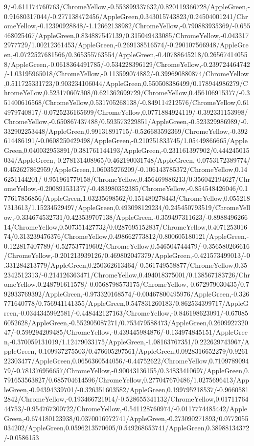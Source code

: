 {\begin{tikzternal}
9/-0.611174760763/ChromeYellow,-0.553899337632/0.820119366728/AppleGreen,-0.91680317044/-0.277138472456/AppleGreen,0.343015743823/0.24504001241/ChromeYellow,-0.12390928848/-1.12662138982/ChromeYellow,-0.790883935369/-0.655468025467/AppleGreen,0.834887547139/0.315049433085/ChromeYellow,-0.0433172977729/1.00212361453/AppleGreen,-0.269138516574/-0.290107566948/AppleGreen,-0.0722527681566/0.365355763554/AppleGreen,-0.40788645218/0.265674140558/AppleGreen,-0.0618364491785/-0.534228396129/ChromeYellow,-0.239724464742/-1.03195965018/ChromeYellow,-0.113599074882/-0.399690880874/ChromeYellow,0.511725331723/0.903234106044/AppleGreen,0.550508386499/0.178944986279/ChromeYellow,0.523170607308/0.621362699729/ChromeYellow,0.456106915377/-0.351400616568/ChromeYellow,0.531705268138/-0.849114212576/ChromeYellow,0.614979740817/-0.0725236165699/ChromeYellow,0.0771884924119/-0.392331153998/ChromeYellow,-0.650867437488/0.593573229851/AppleGreen,-0.523329986989/-0.332902253448/AppleGreen,0.99131891715/-0.526683592369/ChromeYellow,-0.392614486191/-0.0608250429498/AppleGreen,-0.210251833745/1.05449866665/AppleGreen,0.040032953891/0.381761144193/AppleGreen,-0.231161397902/0.444245015034/AppleGreen,-0.278131408965/0.462190031748/AppleGreen,-0.0753172389774/0.452627862959/AppleGreen,1.06035276209/-0.106143785372/ChromeYellow,0.146251144201/-0.951961779158/ChromeYellow,0.456469886213/0.356042194627/ChromeYellow,-0.200891531377/-0.483980352385/ChromeYellow,-0.854548426046/0.177617856856/AppleGreen,1.03235698562/0.151480278443/ChromeYellow,0.0552187313613/1.15234529497/AppleGreen,0.493098129234/0.245450793519/ChromeYellow,-0.334674532731/0.423539707138/AppleGreen,-0.359497311623/-0.898849626614/ChromeYellow,0.507351427732/0.0287695152837/ChromeYellow,0.407125301674/0.313239476376/ChromeYellow,0.498662773812/0.800605180121/AppleGreen,-0.122817407789/-0.527537719602/ChromeYellow,0.546504744479/-0.356580266616/ChromeYellow,-0.201213939126/0.469802047379/AppleGreen,-0.421573499013/-0.331284213779/AppleGreen,0.250362613464/-0.561749558877/ChromeYellow,0.352342512313/-0.214126363471/ChromeYellow,0.494018375001/0.138567183726/ChromeYellow,0.248791611578/-0.0568798573175/ChromeYellow,-0.672979030435/0.792933769392/AppleGreen,-0.973320168574/-0.00467800495976/AppleGreen,-0.326771640778/0.756941141355/AppleGreen,0.547831260183/0.862534399717/AppleGreen,-0.0344345992581/-0.448442127163/ChromeYellow,-0.846198623091/-0.670856052628/AppleGreen,-0.552905087271/0.753479588473/AppleGreen,0.260992732047/-0.599294209485/ChromeYellow,-0.439445984876/-0.134974845151/AppleGreen,-0.370059131019/1.12479033175/AppleGreen,-1.08163767351/0.222629743967/AppleGreen,-0.109937275503/0.476605297561/AppleGreen,0.0928316652279/0.926122303477/AppleGreen,0.0656360544056/-0.44752622/ChromeYellow,0.710978909479/-0.781376956657/ChromeYellow,-0.90043136155/0.34833410697/AppleGreen,0.791653563827/0.685704614596/ChromeYellow,0.277047670486/1.0275696413/AppleGreen,-0.94394339701/-0.326351603582/AppleGreen,0.199795218537/-0.96605812842/ChromeYellow,-0.193466721914/-0.528655341132/ChromeYellow,0.0171176444753/-0.954767300722/ChromeYellow,-0.541128760974/-0.0117774485442/AppleGreen,-0.674180123938/0.0370016972741/AppleGreen,-0.273090271893/0.0772055034202/AppleGreen,0.0596213570605/0.549268653741/AppleGreen,0.38988134372/-0.0586153
\end{tikzternal}}
